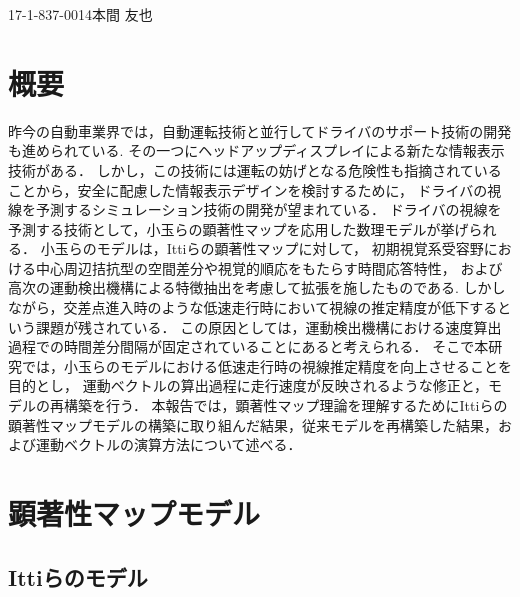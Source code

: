 

             {17-1-837-0014}{本間 友也}




\section{概要}
\vspace

\vspace{-1mm}
昨今の自動車業界では，自動運転技術と並行してドライバのサポート技術の開発も進められている.
その一つにヘッドアップディスプレイによる新たな情報表示技術がある．
しかし，この技術には運転の妨げとなる危険性も指摘されていることから，安全に配慮した情報表示デザインを検討するために，
ドライバの視線を予測するシミュレーション技術の開発が望まれている．
ドライバの視線を予測する技術として，小玉らの顕著性マップを応用した数理モデル\cite{Kodama}が挙げられる．
小玉らのモデルは，Ittiらの顕著性マップ\cite{Itti}に対して，
初期視覚系受容野における中心周辺拮抗型の空間差分や視覚的順応をもたらす時間応答特性，
および高次の運動検出機構による特徴抽出を考慮して拡張を施したものである.
しかしながら，交差点進入時のような低速走行時において視線の推定精度が低下するという課題が残されている．
この原因としては，運動検出機構における速度算出過程での時間差分間隔が固定されていることにあると考えられる．
そこで本研究では，小玉らのモデルにおける低速走行時の視線推定精度を向上させることを目的とし，
運動ベクトルの算出過程に走行速度が反映されるような修正と，モデルの再構築を行う．
本報告では，顕著性マップ理論を理解するためにIttiらの顕著性マップモデルの構築に取り組んだ結果，従来モデルを再構築した結果，および運動ベクトルの演算方法について述べる．

\vspace{-3mm}

\section{顕著性マップモデル}
\vspace{-2mm}
\subsection{Ittiらのモデル}

